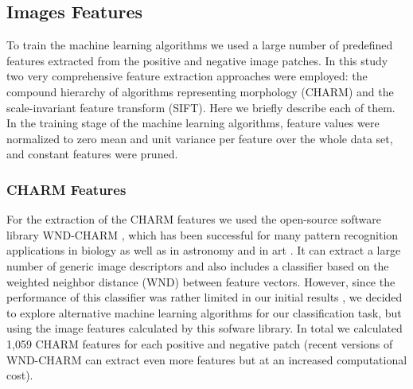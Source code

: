 \subsection{Images Features}
\label{subsec:imageFeaturesExtraction}

To train the machine learning algorithms we used a large number of predefined features extracted from the positive and negative image patches. In this study two very comprehensive feature extraction approaches were employed: the compound hierarchy of algorithms representing morphology (CHARM) and the scale-invariant feature transform (SIFT). Here we briefly describe each of them. In the training stage of the machine learning algorithms, feature values were normalized to zero mean and unit variance per feature over the whole data set, and constant features were pruned.

\subsubsection{CHARM Features}
\label{subsubsec:wnd-chrm}

For the extraction of the CHARM features we used the open-source software library WND-CHARM \cite{shamir2008wndchrm, orlov2008wnd}, which has been successful for many pattern recognition applications in biology \cite{shamir2010pattern, uhlmann2016cp} as well as in astronomy \cite{shamir2012automatic, kuminski2014combining} and in art \cite{shamir2012computer}. It can extract a large number of generic image descriptors and also includes a classifier based on the weighted neighbor distance (WND) between feature vectors. However, since the performance of this classifier was rather limited in our initial results \cite{mata2016automatic}, we decided to explore alternative machine learning algorithms for our classification task, but using the image features calculated by this sofware library. In total we calculated 1,059 CHARM features for each positive and negative patch (recent versions of WND-CHARM can extract even more features but at an increased computational cost).




